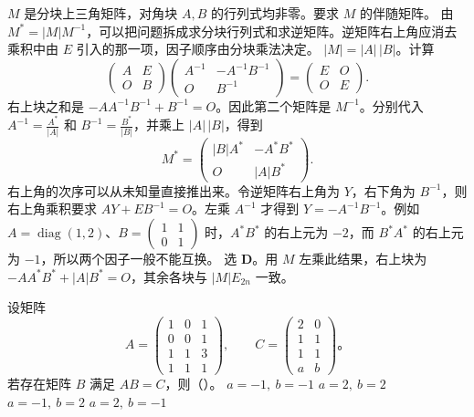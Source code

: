 \documentclass[UTF8,zihao=-4,fontset=fandol]{ctexart}
\begin{document}
\Solution
\Known $M$ 是分块上三角矩阵，对角块 $A,B$ 的行列式均非零。要求 $M$ 的伴随矩阵。
\Method 由 $M^*=|M|M^{-1}$，可以把问题拆成求分块行列式和求逆矩阵。逆矩阵右上角应消去乘积中由 $E$ 引入的那一项，因子顺序由分块乘法决定。
\Derive $|M|=|A|\,|B|$。计算
\[
\begin{pmatrix}A&E\\O&B\end{pmatrix}
\begin{pmatrix}A^{-1}&-A^{-1}B^{-1}\\O&B^{-1}\end{pmatrix}
=\begin{pmatrix}E&O\\O&E\end{pmatrix}.
\]
右上块之和是 $-AA^{-1}B^{-1}+B^{-1}=O$。因此第二个矩阵是 $M^{-1}$。分别代入 $A^{-1}=\frac{A^*}{|A|}$ 和 $B^{-1}=\frac{B^*}{|B|}$，并乘上 $|A|\,|B|$，得到
\[
M^*=\begin{pmatrix}|B|A^*&-A^*B^*\\O&|A|B^*\end{pmatrix}.
\]
右上角的次序可以从未知量直接推出来。令逆矩阵右上角为 $Y$，右下角为 $B^{-1}$，则右上角乘积要求 $AY+EB^{-1}=O$。左乘 $A^{-1}$ 才得到 $Y=-A^{-1}B^{-1}$。例如 $A=\operatorname{diag}(1,2)$、$B=\begin{pmatrix}1&1\\0&1\end{pmatrix}$ 时，$A^*B^*$ 的右上元为 $-2$，而 $B^*A^*$ 的右上元为 $-1$，所以两个因子一般不能互换。
\Verify 选 \textbf{D}。用 $M$ 左乘此结果，右上块为 $-AA^*B^*+|A|B^*=O$，其余各块与 $|M|E_{2n}$ 一致。

设矩阵
\[
A=\begin{pmatrix}1&0&1\\0&0&1\\1&1&3\\1&1&1\end{pmatrix},
\qquad C=\begin{pmatrix}2&0\\1&1\\1&1\\a&b\end{pmatrix}\text{。}
\]
若存在矩阵 $B$ 满足 $AB=C$，则（\quad）。
\Choices
  {$a=-1,\ b=-1$}
  {$a=2,\ b=2$}
  {$a=-1,\ b=2$}
  {$a=2,\ b=-1$}
\end{document}
